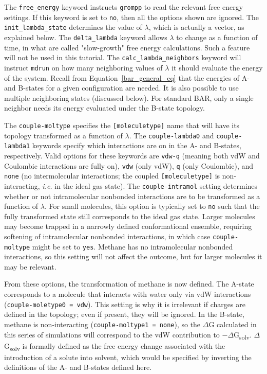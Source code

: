 \documentclass[9pt,tutorial,pubversion]{livecoms}
\begin{document}
The \texttt{free\_energy} keyword instructs \texttt{grompp} to read the relevant free energy settings. If this keyword is set to \texttt{no}, then all the options shown are ignored. The \texttt{init\_lambda\_state} determines the value of $\lambda$, which is actually a vector, as explained below. The \texttt{delta\_lambda} keyword allows $\lambda$ to change as a function of time, in what are called "slow-growth" free energy calculations. Such a feature will not be used in this tutorial. The \texttt{calc\_lambda\_neighbors} keyword will instruct \texttt{mdrun} on how many neighboring values of $\lambda$ it should evaluate the energy of the system. Recall from Equation~\ref{bar_general_eq} that the energies of A- and B-states for a given configuration are needed. It is also possible to use multiple neighboring states (discussed below). For standard BAR, only a single neighbor needs its energy evaluated under the B-state topology.

The \texttt{couple-moltype} specifies the \texttt{[moleculetype]} name that will have its topology transformed as a function of $\lambda$. The \texttt{couple-lambda0} and \texttt{couple-lambda1} keywords specify which interactions are on in the A- and B-states, respectively. Valid options for these keywords are \texttt{vdw-q} (meaning both vdW and Coulombic interactions are fully on), \texttt{vdw} (only vdW), \texttt{q} (only Coulombic), and \texttt{none} (no intermolecular interactions; the coupled \texttt{[moleculetype]} is non-interacting, {\em i.e.} in the ideal gas state). The \texttt{couple-intramol} setting determines whether or not intramolecular nonbonded interactions are to be transformed as a function of $\lambda$. For small molecules, this option is typically set to \texttt{no} such that the fully transformed state still corresponds to the ideal gas state. Larger molecules may become trapped in a narrowly defined conformational ensemble, requiring softening of intramolecular nonbonded interactions, in which case \texttt{couple-moltype} might be set to \texttt{yes}. Methane has no intramolecular nonbonded interactions, so this setting will not affect the outcome, but for larger molecules it may be relevant.

From these options, the transformation of methane is now defined. The A-state corresponds to a molecule that interacts with water only via vdW interactions (\texttt{couple-moletype0 = vdw}). This setting is why it is irrelevant if charges are defined in the topology; even if present, they will be ignored. In the B-state, methane is non-interacting (\texttt{couple-moltype1 = none}), so the $\Delta$G calculated in this series of simulations will correspond to the vdW contribution to $-\Delta$G\textsubscript{solv}. $\Delta$G\textsubscript{solv} is formally defined as the free energy change associated with the introduction of a solute into solvent, which would be specified by inverting the definitions of the A- and B-states defined here.
\end{document}
